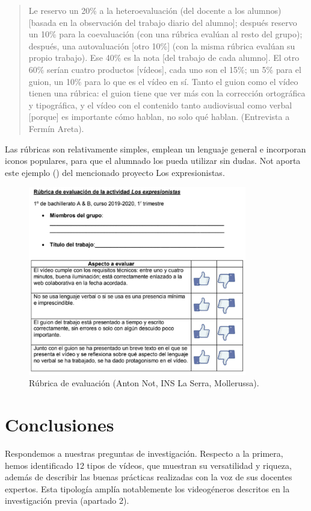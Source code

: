 \documentclass[spanish]{textolivre}
\begin{document}
\begin{quote}
    Le reservo un 20\% a la heteroevaluación (del docente a los alumnos) [basada en la observación del trabajo diario del alumno]; después reservo un 10\% para la coevaluación (con una rúbrica evalúan al resto del grupo); después, una autovaluación [otro 10\%] (con la misma rúbrica evalúan su propio trabajo). Ese 40\% es la nota [del trabajo de cada alumno]. El otro 60\% serían cuatro productos [vídeos], cada uno son el 15\%; un 5\% para el guion, un 10\% para lo que es el vídeo en sí. Tanto el guion como el vídeo tienen una rúbrica: el guion tiene que ver más con la corrección ortográfica y tipográfica, y el vídeo con el contenido tanto audiovisual como verbal [porque] es importante cómo hablan, no solo qué hablan. (Entrevista a Fermín Areta).
\end{quote}

Las rúbricas son relativamente simples, emplean un lenguaje general e incorporan iconos populares, para que el alumnado los pueda utilizar sin dudas. Not aporta este ejemplo () del mencionado proyecto Los expresionistas.

\begin{figure}[htbp]
 \centering
 \includegraphics[width=0.85\textwidth]{Fig10.png}
 \caption{Rúbrica de evaluación (Anton Not, INS La Serra, Mollerussa).}
 \label{fig09}
\end{figure}

\section{Conclusiones}\label{sec-format-simple}
Respondemos a nuestras preguntas de investigación. Respecto a la primera, hemos identificado 12 tipos de vídeos, que muestran su versatilidad y riqueza, además de describir las buenas prácticas realizadas con la voz de sus docentes expertos. Esta tipología amplía notablemente los videogéneros descritos en la investigación previa (apartado 2).
\end{document}
